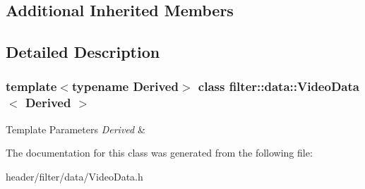 \subsection*{Additional Inherited Members}


\subsection{Detailed Description}
\subsubsection*{template$<$typename Derived$>$\newline
class filter\+::data\+::\+Video\+Data$<$ Derived $>$}


\begin{DoxyTemplParams}{Template Parameters}
{\em Derived} & \\
\hline
\end{DoxyTemplParams}


The documentation for this class was generated from the following file\+:\begin{DoxyCompactItemize}
\item 
header/filter/data/Video\+Data.\+h\end{DoxyCompactItemize}
